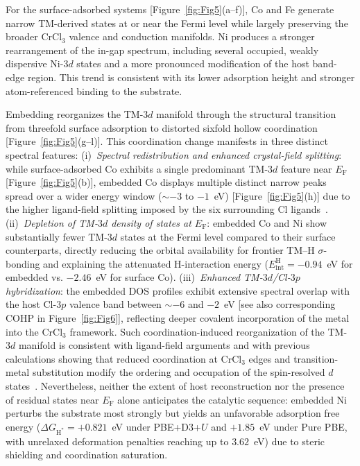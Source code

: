 \documentclass[journal=jacsat,manuscript=article]{achemso}
\begin{document}
For the surface-adsorbed systems [Figure~\ref{fig:Fig5}(a--f)], Co and Fe generate narrow TM-derived states at or near the Fermi level while largely preserving the broader CrCl$_3$ valence and conduction manifolds. Ni produces a stronger rearrangement of the in-gap spectrum, including several occupied, weakly dispersive Ni-$3d$ states and a more pronounced modification of the host band-edge region. This trend is consistent with its lower adsorption height and stronger atom-referenced binding to the substrate.

{\color{revcolor}%
  Embedding reorganizes the TM-$3d$ manifold through the structural transition from threefold surface adsorption to distorted sixfold hollow coordination [Figure~\ref{fig:Fig5}(g--l)]. This coordination change manifests in three distinct spectral features: (i)~\textit{Spectral redistribution and enhanced crystal-field splitting}: while surface-adsorbed Co exhibits a single predominant TM-$3d$ feature near $E_{\mathrm F}$ [Figure~\ref{fig:Fig5}(b)], embedded Co displays multiple distinct narrow peaks spread over a wider energy window ($\sim$$-3$ to $-1$~eV) [Figure~\ref{fig:Fig5}(h)] due to the higher ligand-field splitting imposed by the six surrounding Cl ligands~\cite{Soriano2020,Nharangatt2022}. (ii)~\textit{Depletion of TM-$3d$ density of states at $E_{\mathrm F}$}: embedded Co and Ni show substantially fewer TM-$3d$ states at the Fermi level compared to their surface counterparts, directly reducing the orbital availability for frontier TM--H $\sigma$-bonding and explaining the attenuated H-interaction energy ($E_{\mathrm{int}}^{\mathrm H} = -0.94$~eV for embedded vs. $-2.46$~eV for surface Co). (iii)~\textit{Enhanced TM-$3d$/Cl-$3p$ hybridization}: the embedded DOS profiles exhibit extensive spectral overlap with the host Cl-$3p$ valence band between $\sim$$-6$ and $-2$~eV [see also corresponding COHP in Figure~\ref{fig:Fig6}], reflecting deeper covalent incorporation of the metal into the CrCl$_3$ framework. Such coordination-induced reorganization of the TM-$3d$ manifold is consistent with ligand-field arguments and with previous calculations showing that reduced coordination at CrCl$_3$ edges and transition-metal substitution modify the ordering and occupation of the spin-resolved $d$ states~\cite{Wang2019,Safi2023}. Nevertheless, neither the extent of host reconstruction nor the presence of residual states near $E_{\mathrm F}$ alone anticipates the catalytic sequence: embedded Ni perturbs the substrate most strongly but yields an unfavorable adsorption free energy ($\Delta G_{\mathrm{H}^*} = +0.821$~eV under PBE+D3+$U$ and $+1.85$~eV under Pure PBE, with unrelaxed deformation penalties reaching up to $3.62$~eV) due to steric shielding and coordination saturation.
\par}
\end{document}
